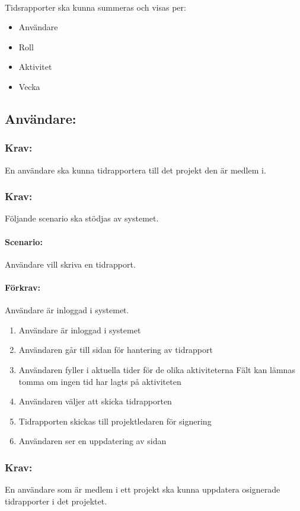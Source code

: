 \documentclass[paper=a4, fontsize=11pt,twoside]{article}
\begin{document}
	\paragraph{}
	Tidsrapporter ska kunna summeras och visas per:
	\begin{itemize}
		\item Användare
		\item Roll
		\item Aktivitet
		\item Vecka
	\end{itemize}
	\subsection{Användare:}
	\subsubsection{Krav:} En användare ska kunna tidrapportera till det projekt den är medlem i.
	\subsubsection{Krav:} Följande scenario ska stödjas av systemet.
	\paragraph{Scenario:} Användare vill skriva en tidrapport.
	\paragraph{Förkrav:}
	Användare är inloggad i systemet.
	
	\begin{enumerate}
		\item	Användare är inloggad i systemet
		\item 	Användaren går till sidan för hantering av tidrapport
		\item 	Användaren fyller i aktuella tider för de olika aktiviteterna Fält kan lämnas tomma om ingen tid har lagts på aktiviteten
		\item	Användaren väljer att skicka tidrapporten
		\item 	Tidrapporten skickas till projektledaren för signering
		\item Användaren ser en uppdatering av sidan
		
		
	\end{enumerate}
	
	\subsubsection{Krav:} En användare som är medlem i ett projekt ska kunna uppdatera osignerade tidrapporter i det projektet.
\end{document}
